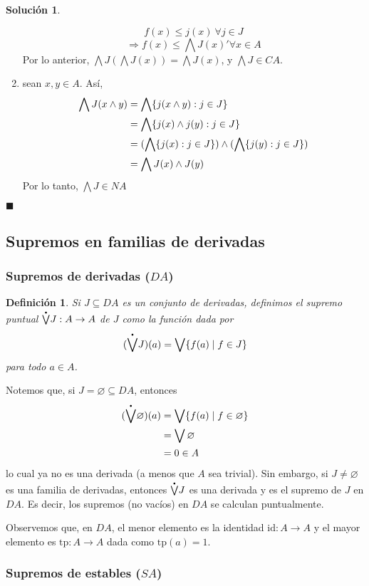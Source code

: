 \documentclass[12pt,letterpaper,titlepage]{article}
\newcommand{\xqed}[1]{%
  \leavevmode\unskip\penalty9999 \hbox{}\nobreak\hfill
  \quad\hbox{\ensuremath{#1}}}
\let\emptyset\varnothing
\newtheorem*{defn}{Definición}
\theoremstyle{definition}
\newtheorem*{soltemp}{Solución}
\newenvironment{sol}[1]{%
    \begin{soltemp}#1}{%
    \xqed{\blacksquare}\end{soltemp}%
}
\newcommand\Sup{\bigvee}
\renewcommand\inf{\wedge}
\newcommand\Inf{\bigwedge}
\newcommand\pSup{%
    {\stackrel{\raisebox{-3pt}{\scalebox{0.5}{$\bullet$}}}{\bigvee}}
  }%
\newcommand\tps[2]{\texorpdfstring{#1}{#2}}
\newcommand\<{\langle}
\renewcommand\>{\rangle}
\newcommand{\id}{\mathrm{id}}
\newcommand{\tp}{\mathrm{tp}}
\begin{document}
\begin{sol}
\begin{enumerate}
        $$f(x)\leq j(x) \ \forall j\in J$$
        $$\Rightarrow f(x)\leq \Inf J(x) ' \forall x\in A$$
        Por lo anterior, $\Inf J(\Inf J(x))=\Inf J(x)$, y $\Inf J \in CA$.
        \item sean $x,y\in A$. Así, 
        \begin{align*}
            \Inf J(x\inf y)&=\Inf\{j(x\inf y):j\in J\}\\
            &=\Inf\{j(x)\inf j(y):j\in J\}\\
            &=\large(\Inf\{j(x):j\in J\}\large)\inf\large( \Inf\{j(y):j\in J\}\large)\\
            &=\Inf J(x)\inf J(y)
        \end{align*}
        Por lo tanto, $\Inf J \in NA$
    \end{enumerate}
\end{sol}

\subsection{Supremos en familias de derivadas}

\subsubsection{Supremos de derivadas \tps{($DA$)}{(DA)}}

\begin{defn}
  Si $J\subseteq DA$ es un conjunto de derivadas,
  definimos el supremo puntual $\pSup J:A\to A$ de $J$ como la
  función dada por
  \[
    (\pSup J)(a) = \Sup\{f(a) \mid f\in J\}
  \]
  para todo $a\in A$.
\end{defn}
Notemos que, si $J=\emptyset\subseteq DA$, entonces
\begin{align*}
  (\pSup\emptyset)(a)
  &= \Sup\{f(a) \mid f\in\emptyset\} \\
  &= \Sup\emptyset \\
  &= 0 \in A
\end{align*}
lo cual ya no es una derivada (a menos que $A$ sea trivial).
Sin embargo, si $J\neq\emptyset$ es una familia de derivadas,
entonces $\pSup J$ es una derivada y es el supremo de $J$ en
$DA$.
Es decir, los supremos (no vacíos) en $DA$ se calculan
puntualmente.

Observemos que, en $DA$, el menor elemento es la identidad
$\id:A\to A$ y el mayor elemento es $\tp:A\to A$ dada como
$\tp(a)=1$.

\subsubsection{Supremos de estables \tps{($SA$)}{(SA)}}
\end{document}
